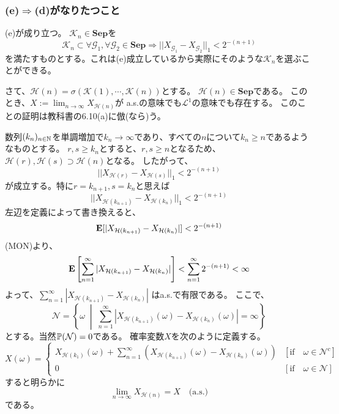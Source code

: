     \subsubsection{(e)$\Rightarrow$(d)がなりたつこと}
      (e)が成り立つ。
      $\mathcal{K}_n \in \mathbf{Sep}$を
      \[
        \mathcal{K}_n \subset \forall \mathcal{G}_1, \forall \mathcal{G}_2 \in \mathbf{Sep} \Rightarrow ||X_{\mathcal{G}_1} - X_{\mathcal{G}_2}||_1 < 2^{-(n+1)}
      \]
      を満たすものとする。これは(e)成立しているから実際にそのような$\mathcal
      {K}_n$を選ぶことができる。

      さて、$\mathcal{H}(n) = \sigma(\mathcal{K}(1), \cdots, \mathcal{K}(n))$とする。
      $\mathcal{H}(n) \in \mathbf{Sep}$である。
      このとき、$X := \lim_{n \to \infty}X_{\mathcal{H}(n)}$が
      a.s.の意味でも$\mathcal{L}^1$の意味でも存在する。
      このことの証明は教科書の6.10(a)に倣(なら)う。

      数列$(k_n)_{n \in {\mathbb{N}}}$を単調増加で$k_n \longrightarrow \infty$であり、すべての$n$について$k_n \ge n$であるようなものとする。
      $r,s \ge k_n$とすると、$r,s \ge n$となるため、
      $\mathcal{H}(r),\mathcal{H}(s) \supset \mathcal{H}(n)$となる。
      したがって、
      \[
        ||X_{\mathcal{H}(r)} - X_{\mathcal{H}(s)}||_1 < 2^{-(n+1)}
      \]
      が成立する。特に$r = k_{n+1}, s = k_n$と思えば
      \[
        ||X_{\mathcal{H}(k_{n+1})} - X_{\mathcal{H}(k_n)}||_1 < 2^{-(n+1)}
      \]
      左辺を定義によって書き換えると、
      \[
        {\mathbf{E}}[|X_{\mathcal{H}(k_{n+1})} - X_{\mathcal{H}(k_n)}|] < 2^{-(n+1)}
      \]
      (MON)より、
      \[
        {\mathbf{E}}\left[\sum_{n=1}^{\infty}|X_{\mathcal{H}(k_{n+1})} - X_{\mathcal{H}(k_n)}|\right] < \sum_{n=1}^{\infty}2^{-(n+1)} < \infty
      \]
      よって、$\displaystyle{\sum_{n=1}^{\infty}|X_{\mathcal{H}(k_{n+1})} - X_{\mathcal{H}(k_n)}|}$
      はa.s.で有限である。
      ここで、
      \[
        \mathcal{N} = \left\{\omega \;\middle|\; \sum_{n=1}^{\infty}|X_{\mathcal{H}(k_{n+1})}(\omega) - X_{\mathcal{H}(k_n)}(\omega)| = \infty \right\}
      \]
      とする。当然${\mathbb{P}}(\mathcal{N}) = 0$である。
      確率変数$X$を次のように定義する。
      \[
        X(\omega)= \begin{cases}
          X_{\mathcal{H}(k_1)}(\omega) + \sum_{n=1}^{\infty} \left(X_{\mathcal{H}(k_{n+1})}(\omega) - X_{\mathcal{H}(k_n)}(\omega) \right) & [\text{if}\quad\omega \in \mathcal{N}^c]\\
          0 & [\text{if}\quad\omega \in \mathcal{N}]
      \end{cases}
      \]
      すると明らかに
      \[
        \lim_{n \to \infty}X_{\mathcal{H}(n)} = X \quad \text{(a.s.)}
      \]
      である。

